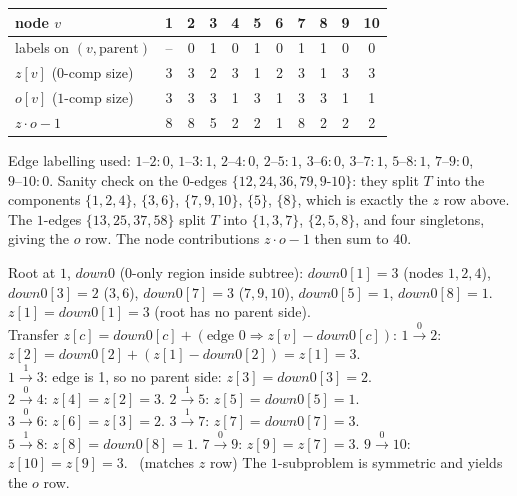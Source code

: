 \begin{center}
\footnotesize
\renewcommand{\arraystretch}{1.2}
\begin{tabular}{l|cccccccccc}
\toprule
node $v$ & 1 & 2 & 3 & 4 & 5 & 6 & 7 & 8 & 9 & 10 \\
\midrule
labels on $(v,\text{parent})$ & -- & 0 & 1 & 0 & 1 & 0 & 1 & 1 & 0 & 0 \\
$z[v]$ ($0$-comp size) & 3 & 3 & 2 & 3 & 1 & 2 & 3 & 1 & 3 & 3 \\
$o[v]$ ($1$-comp size) & 3 & 3 & 3 & 1 & 3 & 1 & 3 & 3 & 1 & 1 \\
$z\!\cdot\!o-1$ & 8 & 8 & 5 & 2 & 2 & 1 & 8 & 2 & 2 & 2 \\
\bottomrule
\end{tabular}
\end{center}

\noindent Edge labelling used: $1\text{--}2{:}0$, $1\text{--}3{:}1$,
$2\text{--}4{:}0$, $2\text{--}5{:}1$, $3\text{--}6{:}0$, $3\text{--}7{:}1$,
$5\text{--}8{:}1$, $7\text{--}9{:}0$, $9\text{--}10{:}0$. Sanity check on the
$0$-edges $\{12,24,36,79,9\text{-}10\}$: they split $T$ into the components
$\{1,2,4\}$, $\{3,6\}$, $\{7,9,10\}$, $\{5\}$, $\{8\}$, which is exactly the
$z$ row above. The $1$-edges $\{13,25,37,58\}$ split $T$ into
$\{1,3,7\}$, $\{2,5,8\}$, and four singletons, giving the $o$ row. The node
contributions $z\cdot o-1$ then sum to $40$.

\begin{tracebox}
Root at $1$, $\mathit{down}0$ (0-only region inside subtree):
$\mathit{down}0[1]=3$ (nodes $1,2,4$), $\mathit{down}0[3]=2$ ($3,6$),
$\mathit{down}0[7]=3$ ($7,9,10$), $\mathit{down}0[5]=1$, $\mathit{down}0[8]=1$.
$z[1]=\mathit{down}0[1]=3$ (root has no parent side).\\
Transfer $z[c]=\mathit{down}0[c]+(\text{edge }0 \Rightarrow z[v]-\mathit{down}0[c])$:
$1\!\xrightarrow{0}\!2$: $z[2]=\mathit{down}0[2]+(z[1]-\mathit{down}0[2])=z[1]=3$.\\
$1\!\xrightarrow{1}\!3$: edge is 1, so no parent side: $z[3]=\mathit{down}0[3]=2$.\\
$2\!\xrightarrow{0}\!4$: $z[4]=z[2]=3$. \quad $2\!\xrightarrow{1}\!5$: $z[5]=\mathit{down}0[5]=1$.\\
$3\!\xrightarrow{0}\!6$: $z[6]=z[3]=2$. \quad $3\!\xrightarrow{1}\!7$: $z[7]=\mathit{down}0[7]=3$.\\
$5\!\xrightarrow{1}\!8$: $z[8]=\mathit{down}0[8]=1$. \quad $7\!\xrightarrow{0}\!9$: $z[9]=z[7]=3$.
\quad $9\!\xrightarrow{0}\!10$: $z[10]=z[9]=3$. \checkmark\ (matches $z$ row)
The $1$-subproblem is symmetric and yields the $o$ row. \checkmark
\end{tracebox}

